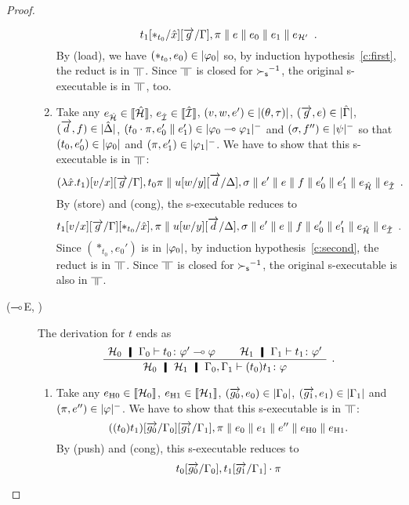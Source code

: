 \begin{proof}
\begin{description}
\begin{enumerate}[label=\textit{(\arabic{*})}]
	       \[
		t_1[\ast_{t_0}/\hat x][\overrightarrow{g}/\Gamma],\pi\parallel{e}\parallel
	       e_0\parallel{e_1}\parallel e_{\mathcal H'}\enspace.
	       \]
	       By (load),
	       we have $(\ast_{t_0}, e_0)\in|{\varphi_0}|$ so, by
	       induction hypothesis~\ref{c:first},
	       the reduct is in $\bbot$.
	       Since $\bbot$ is closed for ${\succ_{\mathsf s}}^{-1}$, the original
	       s-executable is in $\bbot$, too.
	 \item Take any
	       $e_{\hat{\mathcal{H}}}\in \llbracket{\hat{\mathcal{H}}}\rrbracket$,
	       $e_{\hat{\mathcal{I}}}\in \llbracket{\hat{\mathcal{I}}}\rrbracket$,
	       $(v,w,e')\in|{(\theta,\tau)}|$,
	       $(\overrightarrow g, e)\in|{\hat{\Gamma}}|$,
	       $(\overrightarrow d, f)\in|{\hat{\Delta}}|$,
	       $(t_0\cdot\pi,e_0'\parallel e_1')\in|{\varphi_0\multimap\varphi_1}|^-$ and
	       $(\sigma,f'')\in|{\psi}|^-$ so that
	       $(t_0,e_0')\in|{\varphi_0}|$ and
	       $(\pi,e_1')\in|{\varphi_1}|^-$.
	       We have to show that this s-executable is in $\bbot$:
	       \[
	       (\lambda \hat x. t_1)[v/x][\overrightarrow{g}/\Gamma],t_0\pi\parallel
	       u[w/y][\overrightarrow{d}/\Delta],\sigma\parallel
	       e'\parallel {e}\parallel {f} \parallel{e_0'}\parallel{e_1'}\parallel
	       e_{\hat{\mathcal{H}}}\parallel e_{\hat{\mathcal{I}}}\enspace.
	       \]
	       By (store) and (cong), the s-executable reduces to
	       \[
		t_1[v/x][\overrightarrow{g}/\Gamma][\ast_{t_0}/\hat x],\pi\parallel
	       u[w/y][\overrightarrow{d}/\Delta],\sigma\parallel
	       e'\parallel {e}\parallel {f} \parallel{e_0'}\parallel{e_1'}\parallel
	       e_{\hat{\mathcal{H}}}\parallel e_{\hat{\mathcal{I}}}\enspace.
	       \]
	       Since $(\ast_{t_0},e_0')$ is in $|{\varphi_0}|$,
	       by induction hypothesis~\ref{c:second}, the reduct is in
	       $\bbot$.  Since $\bbot$ is closed for ${\succ_{\mathsf s}}^{-1}$,
	       the original s-executable is also in $\bbot$.
	\end{enumerate}
   \item[($\multimap$E, \textminus)]
	The derivation for $t$ ends as
	\[
	\aseq{\hyp{_0}\G_0}{\tj{t_0}{\phi'\limp\phi}}
	\aseq{\hyp{_1}\G_1}{\tj{t_1}{\phi'}}
	\bseq{\hyp{_0}\hyp{_1}\G_0,\G_1}{\tj{(t_0)t_1}{\phi}}
	\DisplayProof\enspace.
	\]
	\begin{enumerate}[label=\textit{(\arabic{*})}]
	 \item Take any
	       $e_{\mathrm{H0}}\in\llbracket{\mathcal H_0}\rrbracket$,
	       $e_{\mathrm{H1}}\in\llbracket{\mathcal H_1}\rrbracket$,
	       $(\overrightarrow{g_0},{e_0})\in|{\Gamma_0}|$,
	       $(\overrightarrow{g_1},{e_1})\in|{\Gamma_1}|$ and
	       $(\pi,e'')\in|{\varphi}|^-$.
	       We have to show that this s-executable is in $\bbot$:
	       \[
		((t_0)t_1)[\overrightarrow{g_0}/\Gamma_0][\overrightarrow{g_1}/\Gamma_1],\pi\parallel
	       {e_0}\parallel {e_1}\parallel e''\parallel e_{\mathrm{H0}}\parallel e_{\mathrm{H1}}.
	       \]
	       By (push) and (cong), this s-executable reduces to
	       \[
		t_0[\overrightarrow{g_0}/\Gamma_0], t_1[\overrightarrow{g_1}/\Gamma_1]\cdot \pi
\]
\end{enumerate}
\end{description}
\end{proof}
